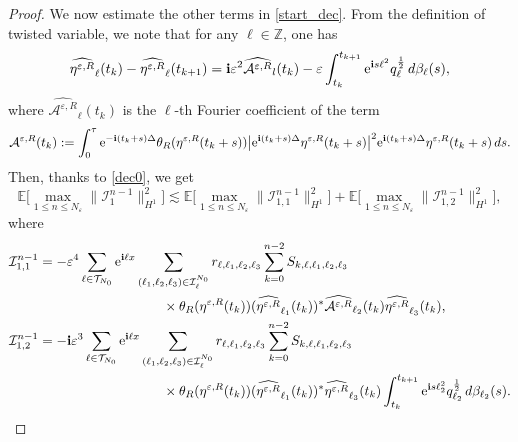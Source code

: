\documentclass[a4paper]{amsart}
\begin{document}
\begin{proof}
   We now estimate the other terms in \eqref{start_dec}. From the definition of twisted variable, we note that for any $\ell\in\mathbb{Z}$, one has
   \begin{equation}
       \label{dec0}
   \widehat{\eta^{\varepsilon,R}}_{\ell}(t_k)-\widehat{\eta^{\varepsilon,R}}_{\ell}(t_{k+1})={\bf i}\varepsilon^2 \widehat{\mathcal{A}^{\varepsilon,R}}_{l}(t_k)-\varepsilon \int_{t_k}^{t_{k+1}}{\rm e}^{{\bf i}s \ell^2}q_{\ell}^{\frac{1}{2}}\,d\beta_\ell(s),
     \end{equation}
   where $\widehat{\mathcal{A}^{\varepsilon,R}}_{\ell}(t_k)$ is the $\ell$-th Fourier coefficient of the term
   \begin{equation}
       \label{dec0a}
   \mathcal{A}^{\varepsilon,R}(t_k):=\int_0^\tau {\rm e}^{-{\bf i}(t_k+s)\Delta}\theta_R(\eta^{\varepsilon,R}(t_k+s))\big| {\rm e}^{{\bf i}(t_k+s)\Delta} \eta^{\varepsilon,R}(t_k+s)\big|^2 {\rm e}^{{\bf i}(t_k+s)\Delta} \eta^{\varepsilon,R}(t_k+s)\,ds.
     \end{equation}
   Then, thanks to \eqref{dec0}, we get
   $$
   \mathbb{E}\big[\max_{1\le n\le N_\varepsilon}\|\mathcal{I}_1^{n-1}\|^{2}_{H^1}\big]\lesssim \mathbb{E}\big[\max_{1\le n\le N_\varepsilon}\|\mathcal{I}_{1,1}^{n-1}\|^{2}_{H^1}\big]+\mathbb{E}\big[\max_{1\le n\le N_\varepsilon}\|\mathcal{I}_{1,2}^{n-1}\|^{2}_{H^1}\big],
   $$
   where
   \begin{align*}
       & \mathcal{I}_{1,1}^{n-1}=-\varepsilon^4 \sum_{\ell\in\mathcal{T}_{N_0}}{\rm e}^{{\bf i}\ell x}\sum_{(\ell_1,\ell_2,\ell_3)\in\mathcal{I}_{\ell}^{N_0}}
    r_{\ell,\ell_1,\ell_2,\ell_3}\sum_{k=0}^{n-2}S_{k,\ell,\ell_1,\ell_2,\ell_3}\\
    &\hspace{4cm}\times \theta_R(\eta^{\varepsilon,R}(t_k)) (\widehat{\eta^{\varepsilon,R}}_{\ell_1}(t_k))^* \widehat{\mathcal{A}^{\varepsilon,R}}_{\ell_2} (t_k)\widehat{\eta^{\varepsilon,R}}_{\ell_3}(t_k),\\
    &\mathcal{I}_{1,2}^{n-1} = -{\bf i}\varepsilon^3  \sum_{\ell\in\mathcal{T}_{N_0}}{\rm e}^{{\bf i}\ell x}\sum_{(\ell_1,\ell_2,\ell_3)\in\mathcal{I}_{\ell}^{N_0}}
    r_{\ell,\ell_1,\ell_2,\ell_3}\sum_{k=0}^{n-2}S_{k,\ell,\ell_1,\ell_2,\ell_3}\\
    &\hspace{4cm}\times \theta_R(\eta^{\varepsilon,R}(t_k)) (\widehat{\eta^{\varepsilon,R}}_{\ell_1}(t_k))^* \widehat{\eta^{\varepsilon,R}}_{\ell_3}(t_k)
     \int_{t_k}^{t_{k+1}}{\rm e}^{{\bf i}s \ell_2^2}q_{\ell_2}^{\frac{1}{2}}\,d\beta_{\ell_2}(s).
   \end{align*}

\end{proof}
\end{document}
